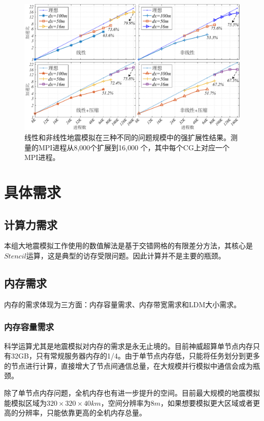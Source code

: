 \documentclass[degree=doctor]{thuthesis}
\begin{document}
\begin{figure}[ht]
\centering
\includegraphics[width=1.0\columnwidth]{strong_scaling.pdf}
\caption{线性和非线性地震模拟在三种不同的问题规模中的强扩展性结果。测量的MPI进程从8,000个扩展到16,000 个，其中每个CG上对应一个MPI进程。}
\label{fig:strong-scaling}
\end{figure}

\chapter{具体需求}

\section{计算力需求}
本组大地震模拟工作使用的数值解法是基于交错网格的有限差分方法，其核心是$Stencil$运算，这是典型的访存受限问题。因此计算并不是主要的瓶颈。

\section{内存需求}
内存的需求体现为三方面：内存容量需求、内存带宽需求和LDM大小需求。

\subsection{内存容量需求}
科学运算尤其是地震模拟对内存的需求是永无止境的。目前神威超算单节点内存只有32GB，只有常规服务器内存的1/4。由于单节点内存低，只能将任务划分到更多的节点进行计算，直接增大了节点间通信总量，在大规模并行模拟中通信会成为瓶颈。

除了单节点内存问题，全机内存也有进一步提升的空间。目前最大规模的地震模拟能模拟区域为$320\times 320\times 40km$，空间分辨率为$8m$，如果想要模拟更大区域或者更高的分辨率，只能依靠更高的全机内存总量。
\end{document}
